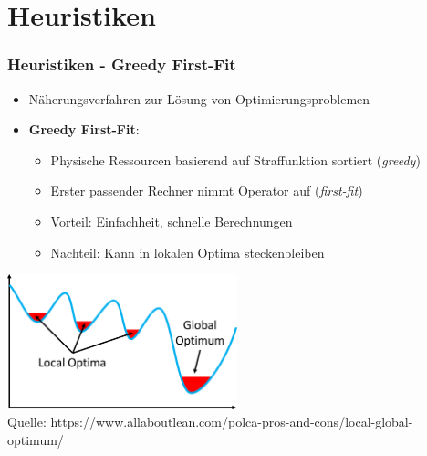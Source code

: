 \documentclass{beamer}
\begin{document}
\section{Heuristiken}
\begin{frame}
\frametitle{Heuristiken - Greedy First-Fit}
\begin{itemize}
    \item Näherungsverfahren zur Lösung von Optimierungsproblemen
    \item \textbf{Greedy First-Fit}: 
    \begin{itemize}
        \item Physische Ressourcen basierend auf Straffunktion sortiert (\textit{greedy})
        \item Erster passender Rechner nimmt Operator auf (\textit{first-fit})
        \item Vorteil: Einfachheit, schnelle Berechnungen
        \item Nachteil: Kann in lokalen Optima steckenbleiben
    \end{itemize}
\end{itemize}
\begin{center}
    \includegraphics[width=0.5\textwidth]{res/Local-Global-Optimum.png} \\
    \tiny \color{gray} Quelle: https://www.allaboutlean.com/polca-pros-and-cons/local-global-optimum/
\end{center}
\end{frame}
\end{document}
